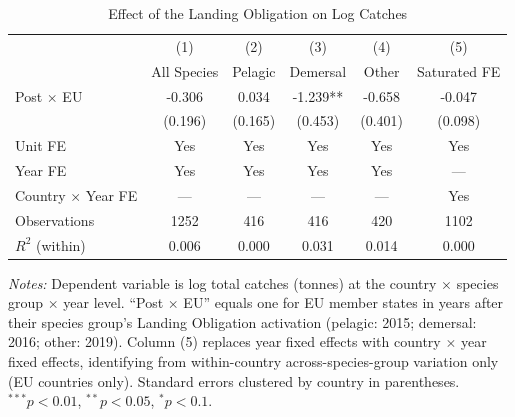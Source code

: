 \begin{table}[htbp]
\centering
\caption{Effect of the Landing Obligation on Log Catches}
\label{tab:main}
\begin{tabular}{lccccc}
\hline\hline
 & (1) & (2) & (3) & (4) & (5) \\
 & All Species & Pelagic & Demersal & Other & Saturated FE \\
\hline
Post $\times$ EU & -0.306 & 0.034 & -1.239** & -0.658 & -0.047 \\
 & (0.196) & (0.165) & (0.453) & (0.401) & (0.098) \\
\hline
Unit FE & Yes & Yes & Yes & Yes & Yes \\
Year FE & Yes & Yes & Yes & Yes & --- \\
Country $\times$ Year FE & --- & --- & --- & --- & Yes \\
Observations & 1252 & 416 & 416 & 420 & 1102 \\
$R^2$ (within) & 0.006 & 0.000 & 0.031 & 0.014 & 0.000 \\
\hline\hline
\end{tabular}
\begin{tablenotes}[flushleft]
\small
\item \textit{Notes:} Dependent variable is log total catches (tonnes) at the country $\times$ species group $\times$ year level. ``Post $\times$ EU'' equals one for EU member states in years after their species group's Landing Obligation activation (pelagic: 2015; demersal: 2016; other: 2019). Column (5) replaces year fixed effects with country $\times$ year fixed effects, identifying from within-country across-species-group variation only (EU countries only). Standard errors clustered by country in parentheses. $^{***}p<0.01$, $^{**}p<0.05$, $^{*}p<0.1$.
\end{tablenotes}
\end{table}
